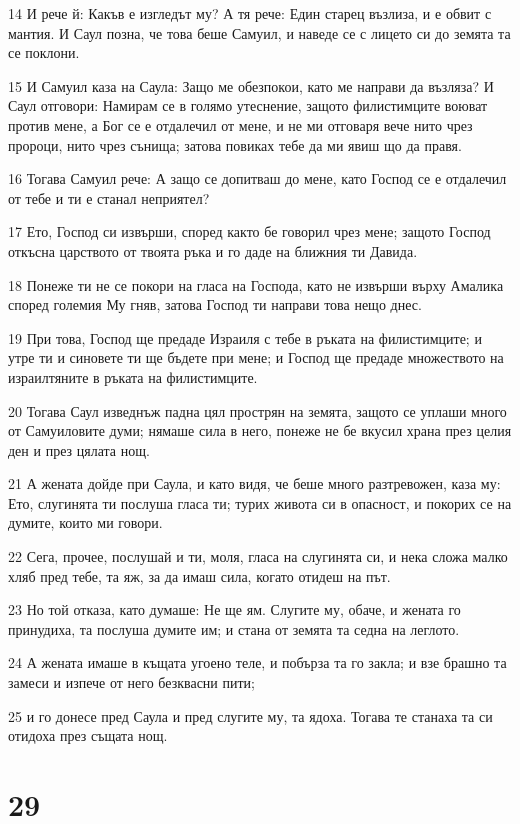 \par 14 И рече й: Какъв е изгледът му? А тя рече: Един старец възлиза, и е обвит с мантия. И Саул позна, че това беше Самуил, и наведе се с лицето си до земята та се поклони.
\par 15 И Самуил каза на Саула: Защо ме обезпокои, като ме направи да възляза? И Саул отговори: Намирам се в голямо утеснение, защото филистимците воюват против мене, а Бог се е отдалечил от мене, и не ми отговаря вече нито чрез пророци, нито чрез сънища; затова повиках тебе да ми явиш що да правя.
\par 16 Тогава Самуил рече: А защо се допитваш до мене, като Господ се е отдалечил от тебе и ти е станал неприятел?
\par 17 Ето, Господ си извърши, според както бе говорил чрез мене; защото Господ откъсна царството от твоята ръка и го даде на ближния ти Давида.
\par 18 Понеже ти не се покори на гласа на Господа, като не извърши върху Амалика според големия Му гняв, затова Господ ти направи това нещо днес.
\par 19 При това, Господ ще предаде Израиля с тебе в ръката на филистимците; и утре ти и синовете ти ще бъдете при мене; и Господ ще предаде множеството на израилтяните в ръката на филистимците.
\par 20 Тогава Саул изведнъж падна цял прострян на земята, защото се уплаши много от Самуиловите думи; нямаше сила в него, понеже не бе вкусил храна през целия ден и през цялата нощ.
\par 21 А жената дойде при Саула, и като видя, че беше много разтревожен, каза му: Ето, слугинята ти послуша гласа ти; турих живота си в опасност, и покорих се на думите, които ми говори.
\par 22 Сега, прочее, послушай и ти, моля, гласа на слугинята си, и нека сложа малко хляб пред тебе, та яж, за да имаш сила, когато отидеш на път.
\par 23 Но той отказа, като думаше: Не ще ям. Слугите му, обаче, и жената го принудиха, та послуша думите им; и стана от земята та седна на леглото.
\par 24 А жената имаше в къщата угоено теле, и побърза та го закла; и взе брашно та замеси и изпече от него безквасни пити;
\par 25 и го донесе пред Саула и пред слугите му, та ядоха. Тогава те станаха та си отидоха през същата нощ.

\chapter{29}

